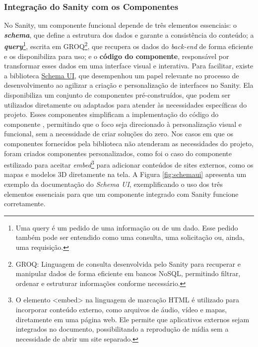     \subsubsection{Integração do Sanity com os Componentes}
    No Sanity, um componente funcional depende de três elementos essenciais: o \textit{\textbf{schema}}, que define a estrutura dos dados e garante a consistência do conteúdo; a \textit{\textbf{query}}\footnote{Uma query é um pedido de uma informação ou de um dado. Esse pedido também pode ser entendido como uma consulta, uma solicitação ou, ainda, uma requisição.}, escrita em GROQ\footnote{GROQ: Linguagem de consulta desenvolvida pelo Sanity para recuperar e manipular dados de forma eficiente em bancos NoSQL, permitindo filtrar, ordenar e estruturar informações conforme necessário.}, que recupera os dados do \textit{back-end} de forma eficiente e os disponibiliza para uso; e o \textbf{código do componente}, responsável por transformar esses dados em uma interface visual e interativa.
    Para facilitar, existe a biblioteca \href{https://schemaui.com/docs/}{Schema UI}, que desempenhou um papel relevante no processo de desenvolvimento ao agilizar a criação e personalização de interfaces no Sanity. Ela disponibiliza um conjunto de componentes pré-construídos, que podem ser utilizados diretamente ou adaptados para atender às necessidades específicas do projeto. Esses componentes simplificam a implementação do código do componente , permitindo que o foco seja direcionado à personalização visual e funcional, sem a necessidade de criar soluções do zero. Nos casos em que os componentes fornecidos pela biblioteca não atenderam as necessidades do projeto, foram criados componentes personalizados, como foi o caso do componente estilizado para aceitar \textit{embed}\footnote{O elemento <embed> na linguagem de marcação HTML é utilizado para incorporar conteúdo externo, como arquivos de áudio, vídeo e mapas, diretamente em uma página web. Ele permite que aplicativos externos sejam integrados no documento, possibilitando a reprodução de mídia sem a necessidade de abrir um site separado.} para adicionar conteúdos de sites externos, como os mapas e modelos 3D diretamente na tela. A Figura \ref{fig:schemaui} apresenta um exemplo da documentação do \textit{Schema UI}, exemplificando o uso dos três elementos essenciais para que um componente integrado com Sanity funcione corretamente.

